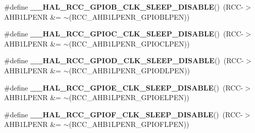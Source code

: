 \begin{DoxyCompactItemize}
\item 
\mbox{\label{group___r_c_c_ex___peripheral___clock___sleep___enable___disable_ga0a20ad851a2ef9e1ccdbf280dcd1dc44}} 
\#define {\bfseries \+\_\+\+\_\+\+H\+A\+L\+\_\+\+R\+C\+C\+\_\+\+G\+P\+I\+O\+B\+\_\+\+C\+L\+K\+\_\+\+S\+L\+E\+E\+P\+\_\+\+D\+I\+S\+A\+B\+LE}()~(R\+CC-\/$>$A\+H\+B1\+L\+P\+E\+NR \&= $\sim$(R\+C\+C\+\_\+\+A\+H\+B1\+L\+P\+E\+N\+R\+\_\+\+G\+P\+I\+O\+B\+L\+P\+EN))
\item 
\mbox{\label{group___r_c_c_ex___peripheral___clock___sleep___enable___disable_ga293f9870ba631d23f8011bad12420f83}} 
\#define {\bfseries \+\_\+\+\_\+\+H\+A\+L\+\_\+\+R\+C\+C\+\_\+\+G\+P\+I\+O\+C\+\_\+\+C\+L\+K\+\_\+\+S\+L\+E\+E\+P\+\_\+\+D\+I\+S\+A\+B\+LE}()~(R\+CC-\/$>$A\+H\+B1\+L\+P\+E\+NR \&= $\sim$(R\+C\+C\+\_\+\+A\+H\+B1\+L\+P\+E\+N\+R\+\_\+\+G\+P\+I\+O\+C\+L\+P\+EN))
\item 
\mbox{\label{group___r_c_c_ex___peripheral___clock___sleep___enable___disable_ga8520028c77aa2ecdd497c313665fa381}} 
\#define {\bfseries \+\_\+\+\_\+\+H\+A\+L\+\_\+\+R\+C\+C\+\_\+\+G\+P\+I\+O\+D\+\_\+\+C\+L\+K\+\_\+\+S\+L\+E\+E\+P\+\_\+\+D\+I\+S\+A\+B\+LE}()~(R\+CC-\/$>$A\+H\+B1\+L\+P\+E\+NR \&= $\sim$(R\+C\+C\+\_\+\+A\+H\+B1\+L\+P\+E\+N\+R\+\_\+\+G\+P\+I\+O\+D\+L\+P\+EN))
\item 
\mbox{\label{group___r_c_c_ex___peripheral___clock___sleep___enable___disable_ga2204e5cccaf75bc541f901fd2beb7381}} 
\#define {\bfseries \+\_\+\+\_\+\+H\+A\+L\+\_\+\+R\+C\+C\+\_\+\+G\+P\+I\+O\+E\+\_\+\+C\+L\+K\+\_\+\+S\+L\+E\+E\+P\+\_\+\+D\+I\+S\+A\+B\+LE}()~(R\+CC-\/$>$A\+H\+B1\+L\+P\+E\+NR \&= $\sim$(R\+C\+C\+\_\+\+A\+H\+B1\+L\+P\+E\+N\+R\+\_\+\+G\+P\+I\+O\+E\+L\+P\+EN))
\item 
\mbox{\label{group___r_c_c_ex___peripheral___clock___sleep___enable___disable_ga035d018d1c3984de9cc06dcb661fff60}} 
\#define {\bfseries \+\_\+\+\_\+\+H\+A\+L\+\_\+\+R\+C\+C\+\_\+\+G\+P\+I\+O\+F\+\_\+\+C\+L\+K\+\_\+\+S\+L\+E\+E\+P\+\_\+\+D\+I\+S\+A\+B\+LE}()~(R\+CC-\/$>$A\+H\+B1\+L\+P\+E\+NR \&= $\sim$(R\+C\+C\+\_\+\+A\+H\+B1\+L\+P\+E\+N\+R\+\_\+\+G\+P\+I\+O\+F\+L\+P\+EN))

\end{DoxyCompactItemize}
